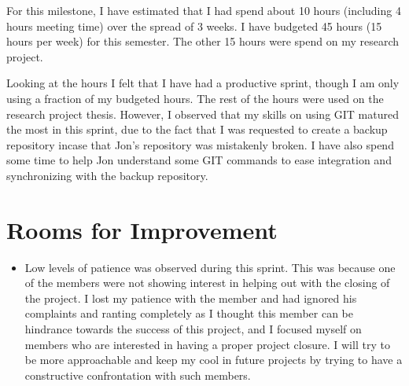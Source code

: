 \documentclass{article}
\begin{document}
For this milestone, I have estimated that I had spend about 10 hours (including 4 hours meeting time) over the spread of 3 weeks. I have budgeted 45 hours (15 hours per week) for this semester. The other 15 hours were spend on my research project. 

Looking at the hours I felt that I have had a productive sprint, though I am only using a fraction of my budgeted hours. The rest of the hours were used on the research project thesis. However, I observed that my skills on using GIT matured the most in this sprint, due to the fact that I was requested to create a backup repository incase that Jon's repository was mistakenly broken. I have also spend some time to help Jon understand some GIT commands to ease integration and synchronizing with the backup repository. 

\section*{Rooms for Improvement}

\begin{itemize}
   \item Low levels of patience was observed during this sprint. This was because one of the members were not showing interest in helping out with the closing of the project. I lost my patience with the member and had ignored his complaints and ranting completely as I thought this member can be hindrance towards the success of this project, and I focused myself on members who are interested in having a proper project closure. I will try to be more approachable and keep my cool in future projects by trying to have a constructive confrontation with such members. 
\end{itemize}
\end{document}

